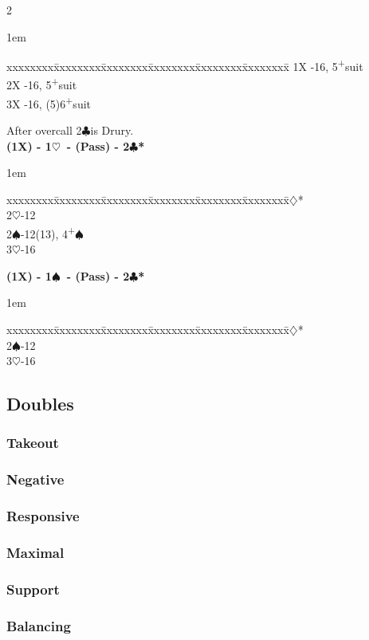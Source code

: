 \documentclass[10pt]{article}
\renewcommand{\c}{$\clubsuit$}
\renewcommand{\d}{$\diamondsuit$}
\newcommand{\h}{$\heartsuit$}
\newcommand{\s}{$\spadesuit$}
\newcommand{\p}{\textsuperscript{+}}
\newcommand{\m}{\textsuperscript{\textminus}}
\newenvironment{bidtable}[1][]
{\textbf{#1}
  \begin{adjustwidth}{1em}{}
    \addvspace{2pt}
    \begin{tabbing}
      xxxxxxxx\=xxxxxxxx\=xxxxxxxx\=xxxxxxxx\=xxxxxxxx\=xxxxxxxx\=\kill}
{\end{tabbing}\end{adjustwidth}\bigskip}%
\begin{document}
\begin{multicols*}{2}
\begin{bidtable}
1X -16, 5\p suit     \\
2X -16, 5\p suit    \\
3X -16, (5)6\p suit
\end{bidtable}

After overcall 2\c is Drury.\\

\begin{bidtable}[(1X) - 1\h\ - (Pass) - 2\c*]
2\d*       {}\m                           \\
2\h        {}-12                         \\
2\s        {}-12(13), 4\p\s               \\
3\h        {}-16
\end{bidtable}

\begin{bidtable}[(1X) - 1\s\ - (Pass) - 2\c*]
2\d* {}\m   \\
2\s  {}-12 \\
3\h  {}-16
\end{bidtable}

\subsection{Doubles}

\subsubsection{Takeout}

\subsubsection{Negative}

\subsubsection{Responsive}

\subsubsection{Maximal}

\subsubsection{Support}

\subsubsection{Balancing}


\end{multicols*}
\end{document}

